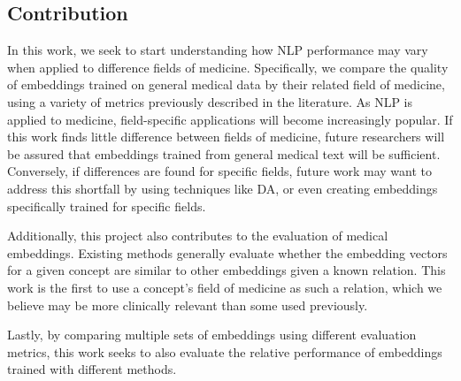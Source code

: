 \documentclass[11pt,a4paper]{article}
\begin{document}
\subsection{Contribution}



In this work, we seek to start understanding how NLP performance may vary when applied to difference fields of medicine. Specifically, we compare the quality of embeddings trained on general medical data by their related field of medicine, using a variety of metrics previously described in the literature. As NLP is applied to medicine, field-specific applications will become increasingly popular. If this work finds little difference between fields of medicine, future researchers will be assured that embeddings trained from general medical text will be sufficient. Conversely, if differences are found for specific fields, future work may want to address this shortfall by using techniques like DA, or even creating embeddings specifically trained for specific fields. 

Additionally, this project also contributes to the evaluation of medical embeddings. Existing methods generally evaluate whether the embedding vectors for a given concept are similar to other embeddings given a known relation. This work is the first to use a concept's field of medicine as such a relation, which we believe may be more clinically relevant than some used previously. 

Lastly, by comparing multiple sets of embeddings using different evaluation metrics, this work seeks to also evaluate the relative performance of embeddings trained with different methods. 

\end{document}
